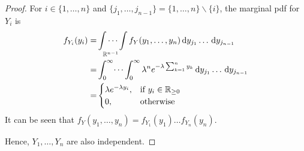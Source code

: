 \documentclass{mthe353answer}
\begin{document}
\begin{questions}
\begin{solution}
\begin{proof}
        For \(i \in \{1, \dots, n\}\) and \(\{j_1, \dots, j_{n-1}\} = \{1, \dots, n\} \backslash \{i\}\), the marginal pdf for \(Y_i\) is
        \begin{align*}
          f_{Y_i}(y_i) =& \idotsint \limits_{\mathbb{R}^{n-1}} f_Y(y_1, \dots, y_n) \, \textrm{d}y_{j_1} \dots \, \textrm{d}y_{j_{n-1}}\\
          =& \int_0^\infty \dots \int_0^\infty \lambda^n e^{-\lambda \sum_{k=1}^n y_k} \, \textrm{d}y_{j_1} \dots \, \textrm{d}y_{j_{n-1}}\\
          =&
          \begin{cases}
            \lambda e^{-\lambda y_i}, & \text{if } y_i \in \mathbb{R}_{\ge 0}\\
            0, & \text{otherwise}
          \end{cases}
        \end{align*}
        It can be seen that \(f_Y(y_1, \dots, y_n) = f_{Y_1}(y_1) \dots f_{Y_n}(y_n)\).

        Hence, \(Y_1, \dots, Y_n\) are also independent.
      \end{proof}
    \end{solution}
  \end{questions}
\end{document}
